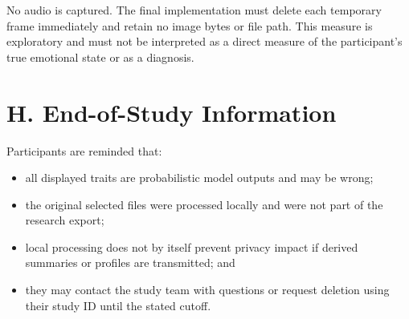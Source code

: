 \documentclass[10pt,a4paper]{article}
\begin{document}
No audio is captured. The final implementation must delete each temporary frame immediately and retain no image bytes or file path. This measure is exploratory and must not be interpreted as a direct measure of the participant's true emotional state or as a diagnosis.

\section*{H. End-of-Study Information}

Participants are reminded that:
\begin{itemize}
  \item all displayed traits are probabilistic model outputs and may be wrong;
  \item the original selected files were processed locally and were not part of the research export;
  \item local processing does not by itself prevent privacy impact if derived summaries or profiles are transmitted; and
  \item they may contact the study team with questions or request deletion using their study ID until the stated cutoff.
\end{itemize}
\end{document}
